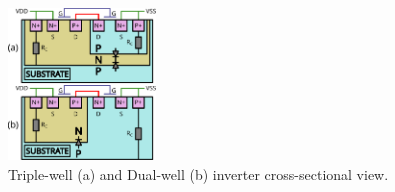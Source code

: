 
\begin{figure}[h]
	\centering
	\includegraphics[width=0.35\textwidth]{./figures/substrate_2.pdf}
	\caption{Triple-well (a) and Dual-well (b) inverter cross-sectional view.}
	\label{fig_sub}
\end{figure}
